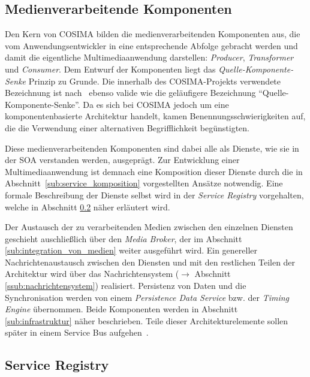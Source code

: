 
\subsection{Medienverarbeitende Komponenten} %
\label{sub:medienverarbeitende_komponenten}

  Den Kern von COSIMA bilden die medienverarbeitenden Komponenten aus, die vom Anwendungsentwickler in eine entsprechende Abfolge gebracht werden und damit die eigentliche Multimediaanwendung darstellen: \emph{Producer}, \emph{Transformer} und \emph{Consumer}. Dem Entwurf der Komponenten liegt das \emph{Quelle-Komponente-Senke} Prinzip zu Grunde. Die innerhalb des COSIMA-Projekts verwendete Bezeichnung ist nach~\citep{a_multimedia_component_kit,multimedia_component_frameworks} ebenso valide wie die geläufigere Bezeichnung "`Quelle-Komponente-Senke"'. Da es sich bei COSIMA jedoch um eine komponentenbasierte Architektur handelt, kamen Benennungsschwierigkeiten auf, die die Verwendung einer alternativen Begrifflichkeit begünstigten.
  
  Diese medienverarbeitenden Komponenten sind dabei alle als Dienste, wie sie in der SOA verstanden werden, ausgeprägt. Zur Entwicklung einer Multimediaanwendung ist demnach eine Komposition dieser Dienste durch die in Abschnitt~\ref{sub:service_komposition} vorgestellten Ansätze notwendig. Eine formale Beschreibung der Dienste selbst wird in der \emph{Service Registry} vorgehalten, welche in Abschnitt \ref{sub:service_registry} näher erläutert wird.
  
  Der Austausch der zu verarbeitenden Medien zwischen den einzelnen Diensten geschieht auschließlich über den \emph{Media Broker}, der im Abschnitt \ref{sub:integration_von_medien} weiter ausgeführt wird. Ein genereller Nachrichtenaustausch zwischen den Diensten und mit den restlichen Teilen der Architektur wird über das Nachrichtensystem ($\to$ Abschnitt \ref{ssub:nachrichtensystem}) realisiert. Persistenz von Daten und die Synchronisation werden von einem \emph{Persistence Data Service} bzw. der \emph{Timing Engine} übernommen. Beide Komponenten werden in Abschnitt \ref{sub:infrastruktur} näher beschrieben. Teile dieser Architekturelemente sollen später in einem Service Bus aufgehen~\citep[S. 18]{bericht}.


\subsection{Service Registry} %
\label{sub:service_registry}

